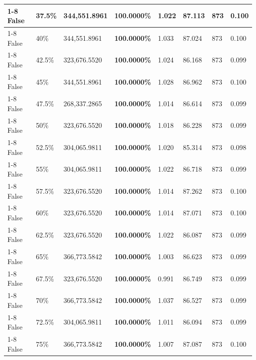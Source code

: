 \begin{table}[H]
{\begin{tabular}{lllrllll}
\cline{1-8} \cline{2-8}
False & 37.5\% & 344,551.8961 & \bfseries \color{red} 100.0000\% & 1.022 & 87.113 & 873 & 0.100 \\
\cline{1-8} \cline{2-8}
False & 40\% & 344,551.8961 & \bfseries \color{red} 100.0000\% & 1.033 & 87.024 & 873 & 0.100 \\
\cline{1-8} \cline{2-8}
False & 42.5\% & 323,676.5520 & \bfseries \color{red} 100.0000\% & 1.024 & 86.168 & 873 & 0.099 \\
\cline{1-8} \cline{2-8}
False & 45\% & 344,551.8961 & \bfseries \color{red} 100.0000\% & 1.028 & 86.962 & 873 & 0.100 \\
\cline{1-8} \cline{2-8}
False & 47.5\% & \color{red} 268,337.2865 & \bfseries \color{red} 100.0000\% & 1.014 & 86.614 & 873 & 0.099 \\
\cline{1-8} \cline{2-8}
False & 50\% & 323,676.5520 & \bfseries \color{red} 100.0000\% & 1.018 & 86.228 & 873 & 0.099 \\
\cline{1-8} \cline{2-8}
False & 52.5\% & 304,065.9811 & \bfseries \color{red} 100.0000\% & 1.020 & 85.314 & 873 & 0.098 \\
\cline{1-8} \cline{2-8}
False & 55\% & 304,065.9811 & \bfseries \color{red} 100.0000\% & 1.022 & 86.718 & 873 & 0.099 \\
\cline{1-8} \cline{2-8}
False & 57.5\% & 323,676.5520 & \bfseries \color{red} 100.0000\% & 1.014 & 87.262 & 873 & 0.100 \\
\cline{1-8} \cline{2-8}
False & 60\% & 323,676.5520 & \bfseries \color{red} 100.0000\% & 1.014 & 87.071 & 873 & 0.100 \\
\cline{1-8} \cline{2-8}
False & 62.5\% & 323,676.5520 & \bfseries \color{red} 100.0000\% & 1.022 & 86.087 & 873 & 0.099 \\
\cline{1-8} \cline{2-8}
False & 65\% & 366,773.5842 & \bfseries \color{red} 100.0000\% & 1.003 & 86.623 & 873 & 0.099 \\
\cline{1-8} \cline{2-8}
False & 67.5\% & 323,676.5520 & \bfseries \color{red} 100.0000\% & 0.991 & 86.749 & 873 & 0.099 \\
\cline{1-8} \cline{2-8}
False & 70\% & 366,773.5842 & \bfseries \color{red} 100.0000\% & 1.037 & 86.527 & 873 & 0.099 \\
\cline{1-8} \cline{2-8}
False & 72.5\% & 304,065.9811 & \bfseries \color{red} 100.0000\% & 1.011 & 86.094 & 873 & 0.099 \\
\cline{1-8} \cline{2-8}
False & 75\% & 366,773.5842 & \bfseries \color{red} 100.0000\% & 1.007 & 87.087 & 873 & 0.100 \\

\end{tabular}}
\end{table}
